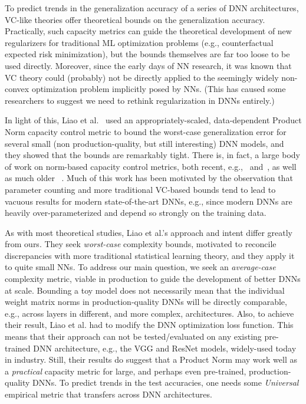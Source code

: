 To predict trends in the generalization accuracy of a series of DNN architectures, VC-like theories offer theoretical bounds on the generalization accuracy. 
Practically, such capacity metrics can guide the
theoretical development of new regularizers for traditional ML optimization problems (e.g., counterfactual expected risk minimization), but the bounds themselves are far too loose to be used directly. 
Moreover, since the early days of NN research, 
it was known that 
VC theory could (probably) not be directly applied to the seemingly widely non-convex optimization problem implicitly posed by NNs. 
(This has caused some researchers to suggest we need to rethink regularization in DNNs entirely.)

In light of this, 
Liao et al.~\cite{LMBx18_TR} used an appropriately-scaled, data-dependent Product Norm capacity control metric to bound the worst-case generalization error for several small (non production-quality, but still interesting) DNN models, and they showed that the bounds are remarkably tight.
%
There is, in fact, a large body of work on norm-based capacity control metrics, both recent, e.g.,~\cite{LMBx18_TR, SHNx17_TR,PLMx18_TR} and~\cite{NTS14_TR,NTS15,NBMS17_TR,BFT17_TR,YM17_TR,KKB17_TR,NBS17_TR,AGNZ18_TR,ACH18_TR,ZF18_TR}, as well as much older ~\cite{Bar97,MN09_TR}. 
Much of this work has been motivated by the observation that parameter counting and more traditional VC-based bounds tend to lead to 
vacuous results for modern state-of-the-art DNNs, e.g., since modern DNNs are heavily over-parameterized and depend so strongly on the training data.

As with most theoretical studies, Liao et al.'s approach and intent differ greatly from ours.
They seek \emph{worst-case} complexity bounds, motivated to reconcile discrepancies with more traditional statistical learning theory, and they apply it to quite small NNs.
To address our main question, we seek an \emph{average-case} complexity metric, viable in production to guide the development of better DNNs at scale.
Bounding a toy model does not necessarily mean that the individual weight matrix norms in production-quality DNNs will be directly comparable, e.g., across layers in different, and more complex, architectures.
Also, to achieve their result, Liao et al. had to modify the DNN optimization loss function.
This means that their approach can not be tested/evaluated on any existing pre-trained DNN architecture, e.g., the VGG and ResNet models, widely-used today in industry. 
Still, their results do suggest that a Product Norm may work well as a \emph{practical} capacity metric for large, and perhaps even pre-trained, production-quality DNNs.   
To predict trends in the test accuracies, one needs some \emph{Universal} empirical metric that transfers across DNN architectures.

